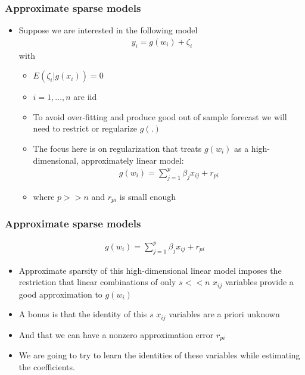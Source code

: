 \documentclass[
  shownotes,
  xcolor={svgnames},
  hyperref={colorlinks,citecolor=DarkBlue,linkcolor=DarkRed,urlcolor=DarkBlue}
  , aspectratio=169]{beamer}
\begin{document}
\begin{frame}[fragile]
\frametitle{Approximate sparse models}

\begin{itemize}
  \item Suppose we are interested in the following model
  \begin{align}
  y_i=g(w_i) + \zeta_i
  \end{align}
  with 
  \begin{itemize}
    \item $E(\zeta_i|g(x_i))=0$
    \item $i=1,\dots,n$ are iid
    \item To avoid over-fitting and produce good out of sample forecast we will need to restrict or regularize $g(.)$
    \item The focus here is on regularization that treats $g(w_i)$ as a high-dimensional, approximately linear model:
    \begin{align}
    g(w_i)=\sum_{j=1}^p \beta_j x_{ij} +r_{pi}
    \end{align}
    \item where $p>>n$ and $r_{pi}$ is small enough 
  
  \end{itemize}
\end{itemize}

\end{frame}
\begin{frame}[fragile]
\frametitle{Approximate sparse models}
\begin{align}
    g(w_i)=\sum_{j=1}^p \beta_j x_{ij} +r_{pi}
    \end{align}

\begin{itemize}

    \item Approximate sparsity of this high-dimensional linear model imposes the restriction that linear combinations of only $s<<n$ $x_{ij}$ variables provide a good approximation to $g(w_i)$
    \medskip
    \item A bonus is that the identity of this $s$ $x_{ij}$ variables are a priori unknown
    \medskip
    \item And that we can have a nonzero approximation error $r_{pi}$
    \medskip
    \item We are going to try to learn the identities of these variables while estimating the coefficients.

\end{itemize}

\end{frame}
\end{document}
